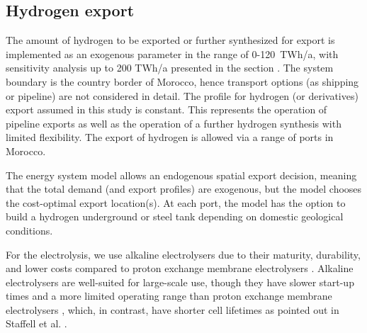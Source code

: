 \documentclass[5p,numafflabel]{elsarticle}
\begin{document}
\subsection*{Hydrogen export}
\label{subsec:hydrogen_export}
The amount of hydrogen to be exported or further synthesized for export is  implemented as an exogenous parameter in the range of 0-120~TWh/a, with sensitivity analysis up to 200 TWh/a presented in the  section . The system boundary is the country border of Morocco, hence transport options (as shipping or pipeline) are not considered in detail. The profile for hydrogen (or derivatives) export assumed in this study is constant. This represents the operation of pipeline exports as well as the operation of a further hydrogen synthesis with limited flexibility. The export of hydrogen is allowed via a range of ports in Morocco.


The energy system model allows an endogenous spatial export decision, meaning that the total demand (and export profiles) are exogenous, but the model chooses the  cost-optimal export location(s). At each port, the model has the option to build a hydrogen underground or steel tank depending on domestic geological conditions.

For the electrolysis, we use alkaline electrolysers due to their maturity, durability, and lower costs compared to proton exchange membrane electrolysers \cite{Staffell2019,DEA2019TechnologyData}.
Alkaline electrolysers are well-suited for large-scale use, though they have slower start-up times and a more limited operating range   
than proton exchange membrane electrolysers \cite{Staffell2019, Gotz2016}, which, in contrast, have  shorter cell lifetimes as pointed out in Staffell et al. \cite{Staffell2019}.







\end{document}
